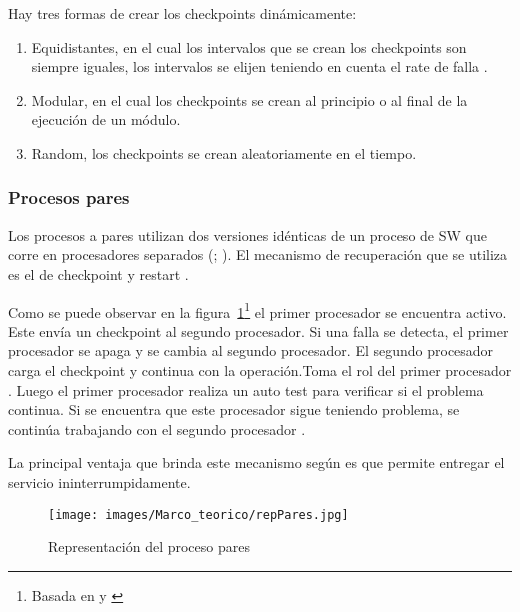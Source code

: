 Hay tres formas de crear los checkpoints dinámicamente:
\begin{enumerate}
 \item Equidistantes, en el cual los intervalos que se crean los checkpoints son siempre iguales, 
los intervalos se elijen teniendo en cuenta el rate de falla \citep{FTDesign}. 
 \item Modular, en el cual los checkpoints se crean al principio o al final de la ejecución de un 
módulo. 
 \item Random, los checkpoints se crean aleatoriamente en el tiempo. 
\end{enumerate}

\subsubsection{Procesos pares}
Los procesos a pares utilizan dos versiones idénticas de un proceso de \ac{SW} que corre en 
procesadores separados (\citep{FTDesign}; \citep{SoftwareFaultToleranceATutorial}). El mecanismo de 
recuperación que se utiliza es el de checkpoint y restart \citep{SoftwareFaultToleranceATutorial}.  

Como se puede observar en la figura~\ref{fig:repPares}\footnote{Basada en \cite{FTDesign} y 
\cite{SoftwareFaultToleranceATutorial}} el primer procesador se encuentra activo. Este envía un 
checkpoint al segundo procesador. Si una falla se detecta, el primer procesador se apaga y se cambia 
al segundo procesador. El segundo procesador carga el checkpoint y continua con la operación.Toma el 
rol del primer procesador \citep{SoftwareFaultToleranceATutorial}. Luego el 
primer procesador realiza un auto test para verificar si el problema continua. Si se encuentra que 
este procesador sigue teniendo problema, se continúa trabajando con el segundo procesador 
\citep{FTDesign}.

La principal ventaja que brinda este mecanismo según \cite{FTDesign} es que permite entregar el 
servicio ininterrumpidamente.

\begin{figure}[h]
 \centering
 \texttt{[image: images/Marco\_teorico/repPares.jpg]}
 \caption{Representación del proceso pares}
 \label{fig:repPares}
\end{figure} 

